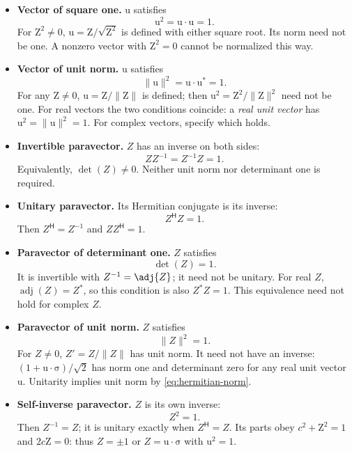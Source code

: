 \documentclass[11pt]{article}
\newcommand{\pv}[1]{{#1}}
\newcommand{\vstyle}[1]{{\bm{\mathrm{#1}}}}
\newcommand{\pZ}{\pv{Z}}
\numberwithin{equation}{section}
\newcommand{\dotprod}{\cdot}
\newcommand{\bsig}{\vstyle{\sigma}}
\newcommand{\bZ}{\vstyle{Z}}
\newcommand{\bu}{\vstyle{u}}
\begin{document}
\begin{itemize}
\item \textbf{Vector of square one.} $\bu$ satisfies
\begin{equation}
 \bu^2=\bu\dotprod\bu=1.
 \label{eq:bilinear-unit-vector}
\end{equation}
For $\bZ^2\ne0$, $\bu=\bZ/\sqrt{\bZ^2}$ is defined with either square root.
Its norm need not be one.  A nonzero vector with $\bZ^2=0$
cannot be normalized this way.
\item \textbf{Vector of unit norm.} $\bu$ satisfies
\begin{equation*}
 \lVert\bu\rVert^2=\bu\dotprod\bu^*=1.
\end{equation*}
For any $\bZ\ne0$, $\bu=\bZ/\lVert\bZ\rVert$ is defined; then
$\bu^2=\bZ^2/\lVert\bZ\rVert^2$ need not be one.
\label{def:real-unit-vector}
For real vectors the two conditions coincide: a \emph{real unit vector}
has $\bu^2=\lVert\bu\rVert^2=1$.  For complex vectors, specify which holds.
\item \textbf{Invertible paravector.} $\pZ$ has an inverse on both sides:
\begin{equation}
 \pZ \pZ^{-1}=\pZ^{-1}\pZ=1.
 \label{eq:unit-paravector}
\end{equation}
Equivalently, $\det(\pZ)\ne0$. Neither unit norm nor determinant one is
required.
\item \textbf{Unitary paravector.} Its Hermitian conjugate is its inverse:
\begin{equation}
 \pZ^{\mathsf H}\pZ=1.
 \label{eq:unitary-transform}
\end{equation}
Then $\pZ^{\mathsf H}=\pZ^{-1}$ and $\pZ \pZ^{\mathsf H}=1$.
\item \textbf{Paravector of determinant one.} $\pZ$ satisfies
\begin{equation}
 \det(\pZ)=1.
 \label{eq:unit-determinant-paravector}
\end{equation}
It is invertible with $\pZ^{-1}=\adj {\pZ}$; it need not be unitary.
For real $\pZ$, $\operatorname{adj}(\pZ)=\pZ^*$, so this condition is also $\pZ^*\pZ=1$.
This equivalence need not hold for complex $\pZ$.
\item \textbf{Paravector of unit norm.} $\pZ$ satisfies
\begin{equation}
 \lVert \pZ\rVert^2=1.
 \label{eq:unit-norm-paravector}
\end{equation}
For $\pZ\ne0$, $\pZ'=\pZ/\lVert \pZ\rVert$ has unit norm.
It need not have an inverse: $(1+\bu\dotprod\bsig)/\sqrt2$ has norm one
and determinant zero for any real unit vector $\bu$.
Unitarity implies unit norm by \eqref{eq:hermitian-norm}.
\item \textbf{Self-inverse paravector.} $\pZ$ is its own inverse:
\begin{equation}
 \pZ^2=1.
 \label{eq:involutory-paravector}
\end{equation}
Then $\pZ^{-1}=\pZ$; it is unitary exactly when $\pZ^{\mathsf H}=\pZ$.
Its parts obey $c^2+\bZ^2=1$ and $2c\bZ=0$:
thus $\pZ=\pm1$ or $\pZ=\bu\dotprod\bsig$ with $\bu^2=1$.
\end{itemize}
\end{document}
